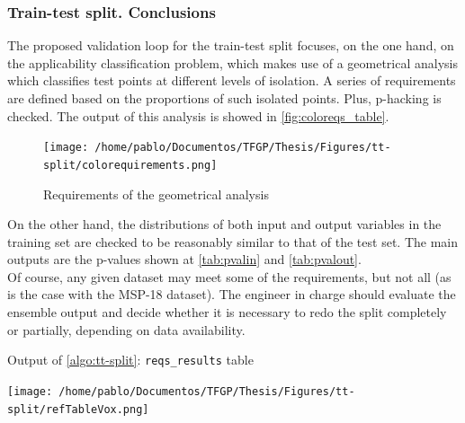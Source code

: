 \subsubsection{Train-test split. Conclusions}
\indent The proposed validation loop for the train-test split focuses, on the one hand, on the applicability classification problem, which makes use of a geometrical analysis which classifies test points at different levels of isolation. A series of requirements are defined based on the proportions of such isolated points. Plus, p-hacking is checked. The output of this analysis is showed in \autoref{fig:coloreqs_table}.\\
%
\begin{figure}[!htb]
	\centering
	\texttt{[image: /home/pablo/Documentos/TFGP/Thesis/Figures/tt-split/colorequirements.png]}
	\caption{Requirements of the geometrical analysis}
	\label{fig:coloreqs_table}
\end{figure}
\indent On the other hand, the distributions of both input and output variables in the training set are checked to be reasonably similar to that of the test set. The main outputs are the p-values shown at \autoref{tab:pvalin} and \autoref{tab:pvalout}.\\
%
\indent Of course, any given dataset may meet some of the requirements, but not all (as is the case with the MSP-18 dataset). The engineer in charge should evaluate the ensemble output and decide whether it is necessary to redo the split completely or partially, depending on data availability.




\clearpage
\begin{table}[htbp]
	\newlength{\voxrefw}
	\edef\tabvoxrefw{\fpeval{\voxrefw*\tabscale}}
	\begin{minipage}{\dimexpr\tabvoxrefw pt\relax}
		\centering
		\caption{Output of \autoref{algo:tt-split}: \texttt{reqs\_results} table}
		\texttt{[image: /home/pablo/Documentos/TFGP/Thesis/Figures/tt-split/refTableVox.png]}
	\end{minipage}
\end{table}

\begin{table}[htbp]
	\centering
\end{table}


